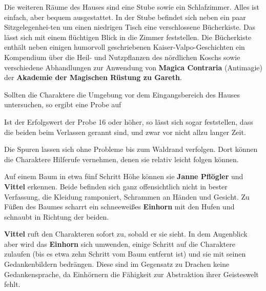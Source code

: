 Die weiteren Räume des Hauses sind eine Stube sowie ein Schlafzimmer. Alles ist einfach, aber bequem ausgestattet. In der Stube befindet sich neben ein paar Sitzgelegenhei-ten um einen niedrigen Tisch eine verschlossene Bücherkiste. Das lässt sich mit einem flüchtigen Blick in die Zimmer feststellen. Die Bücherkiste enthält neben einigen humorvoll geschriebenen Kaiser-Valpo-Geschichten ein Kompendium über die Heil- und Nutzpflanzen des nördlichen Koschs sowie verschiedene Abhandlungen zur Anwendung von \textbf{Magica Contraria} (Antimagie) der \textbf{Akademie der Magischen Rüstung zu Gareth}.

Sollten die Charaktere die Umgebung vor dem Eingangsbereich des Hauses untersuchen, so ergibt eine Probe auf 

Ist der Erfolgswert der Probe 16 oder höher, so lässt sich sogar feststellen, dass die beiden beim Verlassen gerannt sind, und zwar vor nicht allzu langer Zeit.

Die Spuren lassen sich ohne Probleme bis zum Waldrand verfolgen. Dort können die Charaktere Hilferufe vernehmen, denen sie relativ leicht folgen können.
\begin{center}
\end{center}

\neuespalte

Auf einem Baum in etwa fünf Schritt Höhe können sie \textbf{Janne Pflögler} und \textbf{Vittel} erkennen.
	Beide befinden sich ganz offensichtlich nicht in bester Verfassung, die Kleidung ramponiert, Schrammen an Händen und Gesicht.
	Zu Füßen des Baumes scharrt ein schneeweißes \textbf{Einhorn} mit den Hufen und schnaubt in Richtung der beiden.
	
	\textbf{Vittel} ruft den Charakteren sofort zu, sobald er sie sieht.
	In dem Augenblick aber wird das \textbf{Einhorn} sich umwenden, einige Schritt auf die Charaktere zulaufen (bis es etwa zehn Schritt vom Baum entfernt ist) und sie mit seinen Gedankenbildern bedrängen.
	Diese sind im Gegensatz zu Drachen keine Gedankensprache, da Einhörnern die Fähigkeit zur Abstraktion ihrer Geisteswelt fehlt.
 




